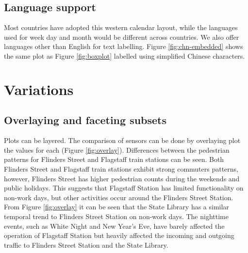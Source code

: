 \documentclass[12pt]{article}
\begin{document}
\hypertarget{language-support}{%
\subsection{Language support}\label{language-support}}

Most countries have adopted this western calendar layout, while the
languages used for week day and month would be different across
countries. We also offer languages other than English for text
labelling. Figure \ref{fig:chn-embedded} shows the same plot as Figure
\ref{fig:boxplot} labelled using simplified Chinese characters.

\hypertarget{variations}{%
\section{Variations}\label{variations}}

\label{sec:variations}

\hypertarget{overlaying-and-faceting-subsets}{%
\subsection{Overlaying and faceting
subsets}\label{overlaying-and-faceting-subsets}}

Plots can be layered. The comparison of sensors can be done by
overlaying plot the values for each (Figure \ref{fig:overlay}).
Differences between the pedestrian patterns for Flinders Street and
Flagstaff train stations can be seen. Both Flinders Street and Flagstaff
train stations exhibit strong commuters patterns, however, Flinders
Street has higher pedestrian counts during the weekends and public
holidays. This suggests that Flagstaff Station has limited functionality
on non-work days, but other activities occur around the Flinders Street
Station. From Figure \ref{fig:overlay} it can be seen that the State
Library has a similar temporal trend to Flinders Street Station on
non-work days. The nighttime events, such as White Night and New Year's
Eve, have barely affected the operation of Flagstaff Station but heavily
affected the incoming and outgoing traffic to Flinders Street Station
and the State Library.
\end{document}
